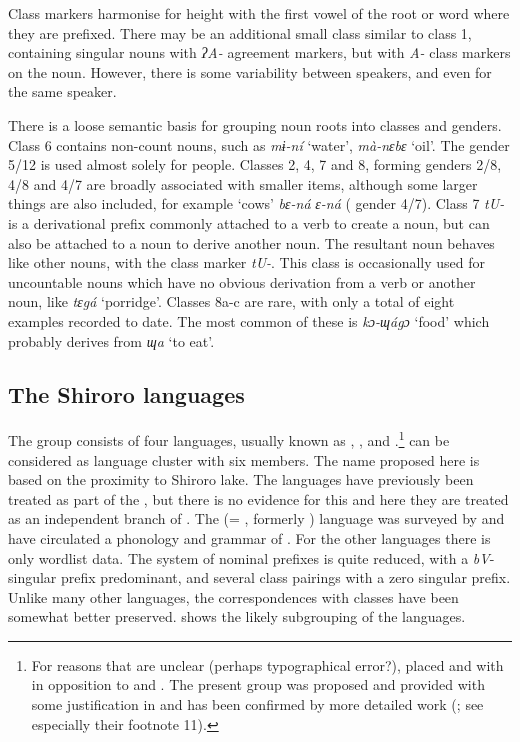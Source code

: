 \documentclass[output=paper]{langsci/langscibook}
\begin{document}
{Class markers harmonise for height with the first vowel of the root or word where they are prefixed. There may be an additional small class similar to class 1, containing singular nouns with} {\textit{ʔ}}\textit{A-} agreement markers, but with \textit{A-} class markers on the noun. However, there is some variability between speakers, and even for the same speaker. 

{There is a loose semantic basis for grouping noun roots into classes and genders. Class 6 contains non-count} nouns, such as \textit{mɨ-ní} ‘water’, \textit{mà-nɛbɛ} ‘oil’. {The gender 5/12 is used almost solely for people. Classes 2, 4, 7 and 8, forming} genders 2/8, 4/8 and 4/7 are broadly associated with smaller items, although some larger things are also included, for example ‘cows’ \textit{bɛ-ná}  \textit{ɛ-ná} ( gender 4/7). {Class 7} {\textit{tU-}}{ is a derivational prefix commonly attached to a verb to create a noun, but can also be attached to a noun to derive another noun. The resultant noun behaves like othe}r nouns, with the class marker \textit{tU-}. This class is occasionally used for uncountable nouns which have no obvious derivation from a verb or another noun, like \textit{tɛgá} ‘porridge’.  {Classes 8a-c are rare, with only a total of eight examples recorded to date. The most common of these is} {\textit{k}}\textit{ɔ-ɰágɔ} ‘food’ {which probably derives from} \textit{ɰa} ‘to eat’.

\subsection{The Shiroro languages}

The  group consists of four languages, usually known as , ,  and .\footnote{For reasons that are unclear (perhaps typographical error?), \citet{Gerhardt1989} placed  and  with  in opposition to  and . The present group was proposed and provided with some justification in \citet{Blench1988} and has been confirmed by more detailed work (\citealt{DettweilerDettweiler2003b}; see especially their footnote 11).}  can be considered as language cluster with six members. The name proposed here is based on the proximity to Shiroro lake. The  languages have previously been treated as part of the , but there is no evidence for this and here they are treated as an independent branch of . The  (= {}, formerly ) language was surveyed by   \citet{DettweilerDettweiler2003b} and  \citet{MacDonellSmith2004} have circulated a phonology and grammar of . For the other languages there is only wordlist data. The  system of nominal prefixes is quite reduced, with a \textit{bV}- singular prefix predominant, and several class pairings with a zero singular prefix. Unlike many other  languages, the correspondences with  classes have been somewhat better preserved.  shows the likely subgrouping of the  languages.
\end{document}
